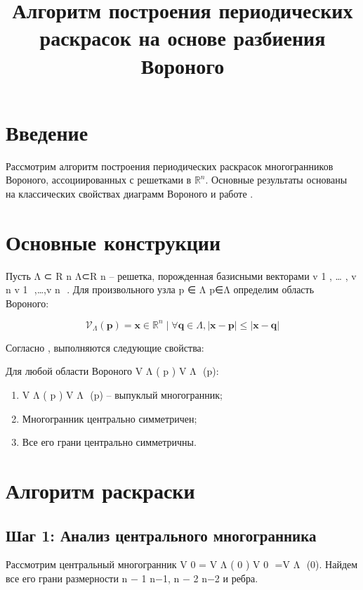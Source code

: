 \documentclass[12pt]{article}
\begin{document}
\title{Алгоритм построения периодических раскрасок на основе разбиения Вороного}



\maketitle

\section{Введение}
Рассмотрим алгоритм построения периодических раскрасок многогранников Вороного, ассоциированных с решетками в 
$\mathbb{R}^n$. Основные результаты основаны на классических свойствах диаграмм Вороного \cite{Voronoi1952} и работе \cite{Ivanov2010}.

\section{Основные конструкции}
Пусть 
Λ
⊂
R
n
Λ⊂R 
n
  -- решетка, порожденная базисными векторами 
v
1
,
…
,
v
n
v 
1
​
 ,…,v 
n
​
 . Для произвольного узла 
p
∈
Λ
p∈Λ определим область Вороного:

\begin{equation}
\mathcal{V}_\Lambda(\mathbf{p}) = {\mathbf{x} \in \mathbb{R}^n \mid \forall \mathbf{q} \in \Lambda, |\mathbf{x} - \mathbf{p}| \leq |\mathbf{x} - \mathbf{q}|}
\end{equation}

Согласно \cite{Voronoi1952}, выполняются следующие свойства:

\begin{lemma} \label{lemma1}
Для любой области Вороного 
V
Λ
(
p
)
V 
Λ
​
 (p):
\begin{enumerate}
\item 
V
Λ
(
p
)
V 
Λ
​
 (p) -- выпуклый многогранник;
\item Многогранник центрально симметричен;
\item Все его грани центрально симметричны.
\end{enumerate}
\end{lemma}

\section{Алгоритм раскраски}
\subsection{Шаг 1: Анализ центрального многогранника}
Рассмотрим центральный многогранник 
V
0
=
V
Λ
(
0
)
V 
0
​
 =V 
Λ
​
 (0). Найдем все его грани размерности 
n
−
1
n−1, 
n
−
2
n−2 и ребра.
\end{document}
